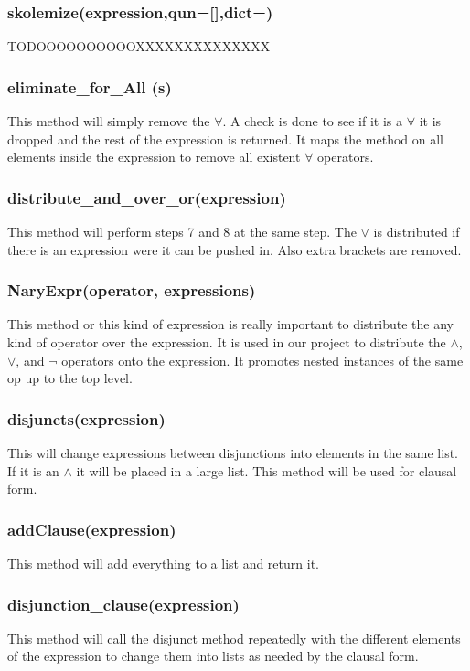 { \subsubsection{skolemize(expression,qun=[],dict={})}
 
TODOOOOOOOOOOXXXXXXXXXXXXXX 
 
 \subsubsection{eliminate\_for\_All (s)}
 This method will simply remove the $\forall$. A check is done to see if it is a $\forall$ it is dropped and the rest of the expression is returned. It maps the method on all elements inside the expression to remove all existent $\forall$ operators.
 
 \subsubsection{distribute\_and\_over\_or(expression)}
 This method will perform steps 7 and 8 at the same step. The $\vee$ is distributed if there is an expression were it can be pushed in. Also extra brackets are removed.
 
 \subsubsection{NaryExpr(operator, expressions)}
This method or this kind of expression is really important to distribute the any kind of operator over the expression. It is used in our project to distribute the $\wedge$, $\vee$, and $\neg$ operators onto the expression. It promotes nested instances of the same op up to the top level.
 
 \subsubsection{disjuncts(expression)}
 This will change expressions between disjunctions into elements in the same list. If it is an $\wedge$ it will be placed in a large list. This method will be used for clausal form.
 
 \subsubsection{addClause(expression)}
This method will add everything to a list and return it.

\subsubsection{disjunction\_clause(expression)}
This method will call the disjunct method repeatedly with the different elements of the expression to change them into lists as needed by the clausal form.

}
